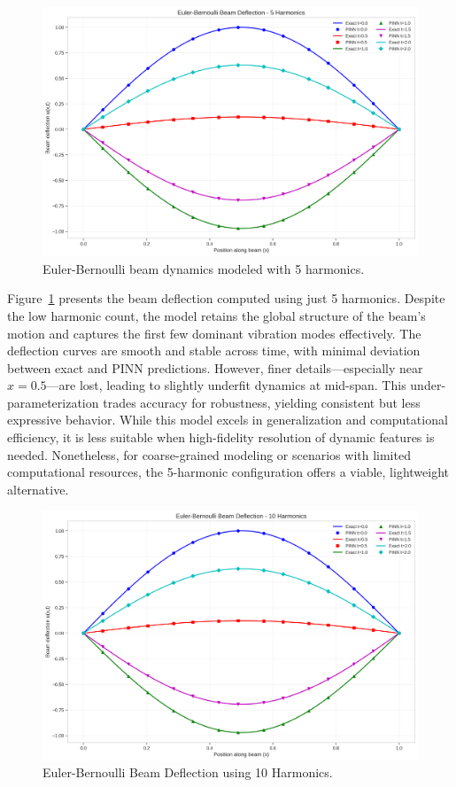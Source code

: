 \documentclass[preprint,12pt]{elsarticle}
\begin{document}
\begin{figure}[t]
    \centering
    \includegraphics[width=0.9\linewidth]{figures/euler_bernoulli_beam_5h.png}
    \caption{Euler-Bernoulli beam dynamics modeled with 5 harmonics.}
    \label{fig:euler_bernoulli_beam_5h}
\end{figure}

Figure~\ref{fig:euler_bernoulli_beam_5h} presents the beam deflection computed using just 5 harmonics. Despite the low harmonic count, the model retains the global structure of the beam’s motion and captures the first few dominant vibration modes effectively. The deflection curves are smooth and stable across time, with minimal deviation between exact and PINN predictions. However, finer details—especially near $x=0.5$—are lost, leading to slightly underfit dynamics at mid-span. This under-parameterization trades accuracy for robustness, yielding consistent but less expressive behavior. While this model excels in generalization and computational efficiency, it is less suitable when high-fidelity resolution of dynamic features is needed. Nonetheless, for coarse-grained modeling or scenarios with limited computational resources, the 5-harmonic configuration offers a viable, lightweight alternative.

\begin{figure}[t]
    \centering
    \includegraphics[width=0.9\linewidth]{figures/euler_bernoulli_beam_10h.png}
    \caption{Euler-Bernoulli Beam Deflection using 10 Harmonics.}
    \label{fig:beam_deflection_10h}
\end{figure}
\end{document}
